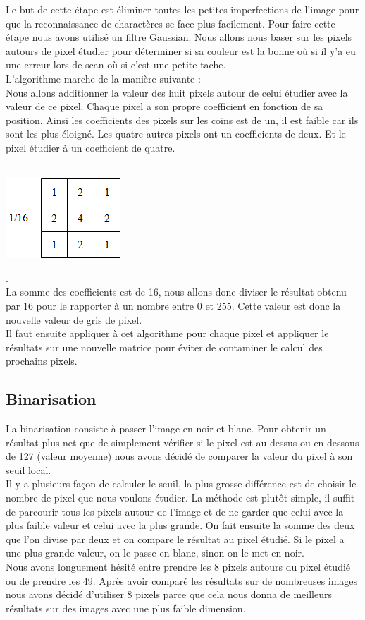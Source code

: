 \documentclass [french,12pt]{article}
\begin{document}
Le but de cette étape est éliminer toutes les petites imperfections de l’image pour que la reconnaissance de charactères se face plus facilement. Pour faire cette étape nous avons utilisé un filtre Gaussian. Nous allons nous baser sur les pixels autours de pixel étudier pour déterminer si sa couleur est la bonne où si il y’a eu une erreur lors de scan où si c’est une petite tache.\\
	L’algorithme marche de la manière suivante :\\
	Nous allons additionner la valeur des huit pixels autour de celui étudier avec la valeur de ce pixel. Chaque pixel a son propre coefficient en fonction de sa position. Ainsi les coefficients des pixels sur les coins est de un, il est faible car ils sont les plus éloigné. Les quatre autres pixels ont un coefficients de deux. Et le pixel étudier à un coefficient de quatre.\\
\\
\begin{center} \includegraphics[scale=0.7]{Inline2.png} \end{center}.
\\
La somme des coefficients est de 16, nous allons donc diviser le résultat obtenu par 16 pour le rapporter à un nombre entre 0 et 255. Cette valeur est donc la nouvelle valeur de gris de pixel.
\\
	Il faut ensuite appliquer à cet algorithme pour chaque pixel et appliquer le résultats sur une nouvelle matrice pour éviter de contaminer le calcul des prochains pixels.

\subsection{Binarisation}

La binarisation consiste à passer l’image en noir et blanc. Pour obtenir un résultat plus net que de simplement vérifier si le pixel est au dessus ou en dessous de 127 (valeur moyenne) nous avons décidé de comparer la valeur du pixel à son seuil local. 
	\\Il y a plusieurs façon de calculer le seuil, la plus grosse différence est de choisir le nombre de pixel que nous voulons étudier. La méthode est plutôt simple, il suffit de parcourir tous les pixels autour de l’image et de ne garder que celui avec la plus faible valeur et celui avec la plus grande. On fait ensuite la somme des deux que l’on divise par deux et on compare le résultat au pixel étudié. Si le pixel a une plus grande valeur, on le passe en blanc, sinon on le met en noir.
 \\Nous avons longuement hésité entre prendre les 8 pixels autours du pixel étudié ou de prendre les 49. Après avoir comparé les résultats sur de nombreuses images nous avons décidé d’utiliser 8 pixels parce que cela nous donna de meilleurs résultats sur des images avec une plus faible dimension.
\\
\\
\end{document}
